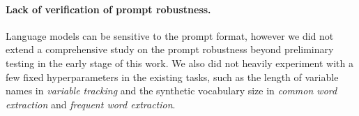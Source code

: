 \paragraph{Lack of verification of prompt robustness.} Language models can be sensitive to the prompt format, however we did not extend a comprehensive study on the prompt robustness beyond preliminary testing in the early stage of this work. We also did not heavily experiment with a few fixed hyperparameters in the existing tasks, such as the length of variable names in \emph{variable tracking} and the synthetic vocabulary size in \emph{common word extraction} and \emph{frequent word extraction}.

